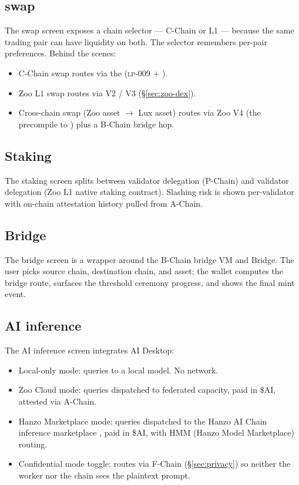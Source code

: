 \subsection{\DEX{} swap}

The swap screen exposes a chain selector --- \Lux{} C-Chain or \Zoo{}
L1 --- because the same trading pair can have liquidity on both. The
selector remembers per-pair preferences. Behind the scenes:

\begin{itemize}[leftmargin=1.2em]
  \item C-Chain swap routes via the \Lux{} \DEX{} (\textsc{lp-009}
        + \cite{lux-dex}).
  \item Zoo L1 swap routes via \Zoo{} \DEX{} V2 / V3
        (\S\ref{sec:zoo-dex}).
  \item Cross-chain swap (Zoo asset $\rightarrow$ Lux asset) routes
        via Zoo \DEX{} V4 (the precompile to \Lux{} \DEX{}) plus
        a B-Chain bridge hop.
\end{itemize}

\subsection{Staking}

The staking screen splits between \Lux{} validator delegation
(P-Chain) and \Zoo{} validator delegation (Zoo L1 native staking
contract). Slashing risk is shown per-validator with on-chain
attestation history pulled from A-Chain.

\subsection{Bridge}

The bridge screen is a wrapper around the B-Chain bridge VM and
\Zoo{} Bridge. The user picks source chain, destination chain, and
asset; the wallet computes the bridge route, surfaces the threshold
ceremony progress, and shows the final mint event.

\subsection{AI inference}

The AI inference screen integrates \Zoo{} AI Desktop:

\begin{itemize}[leftmargin=1.2em]
  \item Local-only mode: queries to a local \Zen{} model. No network.
  \item Zoo Cloud mode: queries dispatched to federated \GPU{}
        capacity, paid in \$AI, attested via A-Chain.
  \item Hanzo Marketplace mode: queries dispatched to the Hanzo AI
        Chain inference marketplace \cite{hanzo-ai-chain}, paid in
        \$AI, with HMM (Hanzo Model Marketplace) routing.
  \item Confidential mode toggle: routes via F-Chain \FHE{}
        (\S\ref{sec:privacy}) so neither the worker nor the chain
        sees the plaintext prompt.
\end{itemize}

